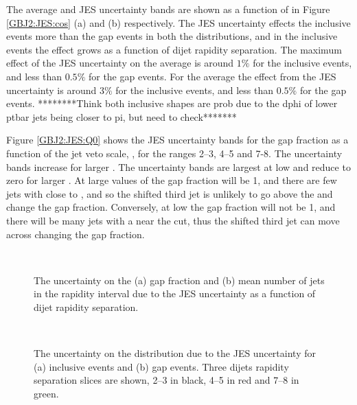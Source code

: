 The average \cosdphi{} and \costwodphi{} JES uncertainty bands are shown as a function of \dy{} in Figure \ref{GBJ2:JES:cos} (a) and (b) respectively. 
The JES uncertainty effects the inclusive events more than the gap events in both the distributions, and in the inclusive events the effect grows as a function of dijet rapidity separation.
The maximum effect of the JES uncertainty on the average \cosdphi{} is around $1\%$ for the inclusive events, and less than $0.5\%$ for the gap events.
For the average \costwodphi{} the effect from the JES uncertainty is around $3\%$ for the inclusive events, and less than $0.5\%$ for the gap events. 
********Think both inclusive shapes are prob due to the dphi of lower ptbar jets being closer to pi, but need to check*******

Figure \ref{GBJ2:JES:Q0} shows the JES uncertainty bands for the gap fraction as a function of the jet veto scale, \qz{}, for the \dy{} ranges 2--3, 4--5 and 7-8.
The uncertainty bands increase for larger \dy{}.
The uncertainty bands are largest at low \qz{} and reduce to zero for larger \qz{}.
At large values of \qz{} the gap fraction will be 1, and there are few jets with \pt{} close to \qz{}, and so the shifted third jet is unlikely to go above the \qz{} and change the gap fraction.
Conversely, at low \qz{} the gap fraction will not be 1, and there will be many jets with a \pt{} near the \qz{} cut, thus the shifted third jet \pt{}  can move across \qz{} changing the gap fraction.


\begin{figure}
\centering
\mbox{
              \quad
              \quad
                              }
\caption[]{
The uncertainty on the (a) gap fraction and (b) mean number of jets in the rapidity interval due to the JES uncertainty as a function of dijet rapidity separation. 
\label{GBJ2:JES:gap_njets}}
\end{figure}



\begin{figure}
\centering
\mbox{
              \quad
              \quad
                              }
\caption[]{
The uncertainty on the \dphi{} distribution due to the JES uncertainty for (a) inclusive events and (b) gap events. 
Three dijets rapidity separation slices are shown, 2--3 in black, 4--5 in red and 7--8 in green.
\label{GBJ2:JES:dPhi}}
\end{figure}


